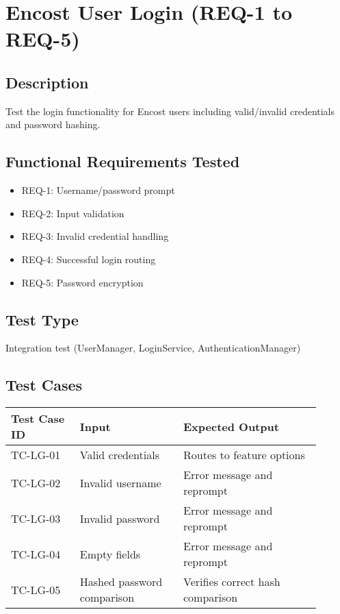 \documentclass{scrreprt}
\begin{document}
\section{Encost User Login (REQ-1 to REQ-5)}
\subsection{Description}
Test the login functionality for Encost users including valid/invalid credentials and password hashing.

\subsection{Functional Requirements Tested}
\begin{itemize}
    \item REQ-1: Username/password prompt
    \item REQ-2: Input validation
    \item REQ-3: Invalid credential handling
    \item REQ-4: Successful login routing
    \item REQ-5: Password encryption
\end{itemize}

\subsection{Test Type}
Integration test (UserManager, LoginService, AuthenticationManager)

\subsection{Test Cases}
\begin{table}[h!]
\centering
\begin{tabular}{|p{0.2\linewidth}|p{0.3\linewidth}|p{0.4\linewidth}|}
    \hline
    Test Case ID & Input & Expected Output \\
    \hline
    TC-LG-01 & Valid credentials & Routes to feature options \\
    \hline
    TC-LG-02 & Invalid username & Error message and reprompt \\
    \hline
    TC-LG-03 & Invalid password & Error message and reprompt \\
    \hline
    TC-LG-04 & Empty fields & Error message and reprompt \\
    \hline
    TC-LG-05 & Hashed password comparison & Verifies correct hash comparison \\
    \hline
\end{tabular}
\end{table}
\end{document}
